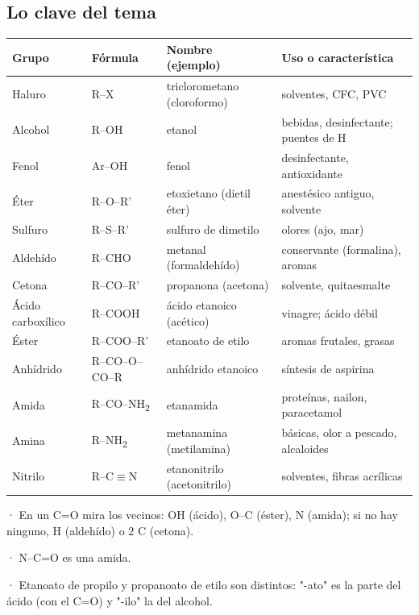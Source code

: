\subsection{Lo clave del tema}
\begin{center}\small
\begin{tabularx}{\linewidth}{@{}>{\raggedright\arraybackslash\hsize=0.72\hsize}X>{\raggedright\arraybackslash\hsize=0.60\hsize}X>{\raggedright\arraybackslash\hsize=1.15\hsize}X>{\raggedright\arraybackslash\hsize=1.53\hsize}X@{}}
\toprule
\textbf{Grupo} & \textbf{Fórmula} & \textbf{Nombre (ejemplo)} & \textbf{Uso o característica} \\
\midrule
Haluro & R--X & triclorometano (cloroformo) & solventes, CFC, PVC \\
Alcohol & R--OH & etanol & bebidas, desinfectante; puentes de H \\
Fenol & Ar--OH & fenol & desinfectante, antioxidante \\
Éter & R--O--R' & etoxietano (dietil éter) & anestésico antiguo, solvente \\
Sulfuro & R--S--R' & sulfuro de dimetilo & olores (ajo, mar) \\
Aldehído & R--CHO & metanal (formaldehído) & conservante (formalina), aromas \\
Cetona & R--CO--R' & propanona (acetona) & solvente, quitaesmalte \\
Ácido carboxílico & R--COOH & ácido etanoico (acético) & vinagre; ácido débil \\
Éster & R--COO--R' & etanoato de etilo & aromas frutales, grasas \\
Anhídrido & R--CO--O--CO--R & anhídrido etanoico & síntesis de aspirina \\
Amida & R--CO--NH\textsubscript{2} & etanamida & proteínas, nailon, paracetamol \\
Amina & R--NH\textsubscript{2} & metanamina (metilamina) & básicas, olor a pescado, alcaloides \\
Nitrilo & R--C\ensuremath{\equiv}N & etanonitrilo (acetonitrilo) & solventes, fibras acrílicas \\
\bottomrule
\end{tabularx}
\end{center}
  
\begin{clave}[{Recuerda}] · En un C=O mira los vecinos: OH (ácido), O--C (éster), N (amida); si no hay ninguno, H (aldehído) o 2 C (cetona).\par · N--C=O es una amida.\par · Etanoato de propilo y propanoato de etilo son distintos: "-ato" es la parte del ácido (con el C=O) y "-ilo" la del alcohol.\end{clave}
  
